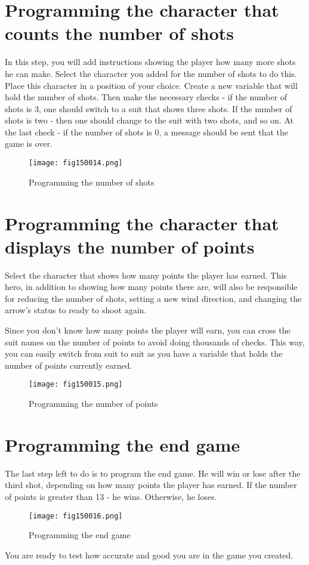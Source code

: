 \section{Programming the character that counts the number of shots}

In this step, you will add instructions showing the player how many more shots he can make. Select the character you added for the number of shots to do this. Place this character in a position of your choice. Create a new variable that will hold the number of shots. Then make the necessary checks - if the number of shots is 3, one should switch to a suit that shows three shots. If the number of shots is two - then one should change to the suit with two shots, and so on. At the last check - if the number of shots is 0, a message should be sent that the game is over.

\begin{figure}[H]
   \centering
   \texttt{[image: fig150014.png]}
   \caption{Programming the number of shots}
\label{fig150014}
\end{figure}

\section{Programming the character that displays the number of points}

Select the character that shows how many points the player has earned. This hero, in addition to showing how many points there are, will also be responsible for reducing the number of shots, setting a new wind direction, and changing the arrow's status to ready to shoot again.

Since you don't know how many points the player will earn, you can cross the suit names on the number of points to avoid doing thousands of checks. This way, you can easily switch from suit to suit as you have a variable that holds the number of points currently earned.

\begin{figure}[H]
   \centering
   \texttt{[image: fig150015.png]}
   \caption{Programming the number of points}
\label{fig150015}
\end{figure}

\section{Programming the end game}

The last step left to do is to program the end game. He will win or lose after the third shot, depending on how many points the player has earned. If the number of points is greater than 13 - he wins. Otherwise, he loses.

\begin{figure}[H]
   \centering
   \texttt{[image: fig150016.png]}
   \caption{Programming the end game}
\label{fig150016}
\end{figure}

You are ready to test how accurate and good you are in the game you created.
